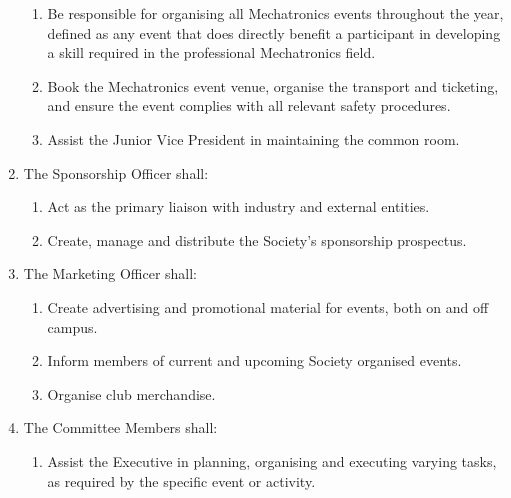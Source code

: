 \documentclass[11pt]{article}
\begin{document}
\begin{enumerate}[\thesection .1]
    \begin{enumerate}
        \item Be responsible for organising all Mechatronics events throughout the year, defined as any event that does directly benefit a participant in developing a skill required in the professional Mechatronics field.
        \item Book the Mechatronics event venue, organise the transport and ticketing, and ensure the event complies with all relevant safety procedures.
        \item Assist the Junior Vice President in maintaining the common room.	
    \end{enumerate}
    \item The Sponsorship Officer shall:
    \begin{enumerate}
        \item Act as the primary liaison with industry and external entities.
        \item Create, manage and distribute the Society's sponsorship prospectus.
    \end{enumerate}
    \item The Marketing Officer shall:
    \begin{enumerate}
        \item Create advertising and promotional material for events, both on and off campus.
        \item Inform members of current and upcoming Society organised events.
        \item Organise club merchandise.
    \end{enumerate}
    \item The Committee Members shall:
    \begin{enumerate}
        \item Assist the Executive in planning, organising and executing varying tasks, as required by the specific event or activity.
    \end{enumerate}
\end{enumerate}
\end{document}

